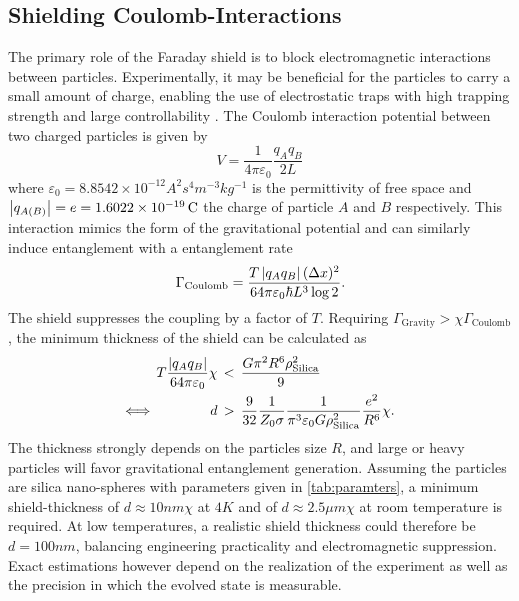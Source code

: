\subsection{Shielding Coulomb-Interactions}
The primary role of the Faraday shield is to block electromagnetic interactions between particles.
Experimentally, it may be beneficial for the particles to carry a small amount of charge, enabling the use of electrostatic traps with high trapping strength and large controllability \cite{GonzalezBallestero_2021}. 
The Coulomb interaction potential between two charged particles is given by
\begin{equation}
  V = \frac{1}{4\pi\varepsilon_0} \frac{q_A q_B}{2L}
\end{equation}
where $\varepsilon_0 = 8.8542\times 10^{-12}\si{A^2 s^4 m^{-3} kg^{-1}}$ is the permittivity of free space and $\left\lvert q_{A(B)}\right\rvert = e = 1.6022\times 10^{-19}\, \mathrm{C}$ the charge of particle $A$ and $B$ respectively.
This interaction mimics the form of the gravitational potential and can similarly induce entanglement with a entanglement rate
\begin{equation}\label{eq:5:entanglement-rate-coulomb}
  \Gamma_\mathrm{Coulomb} = \frac{T \left\lvert q_A q_B\right\rvert (\Delta x)^2}{64 \pi \varepsilon_0 \hbar L^3 \log 2} .
\end{equation}
The shield suppresses the coupling by a factor of $T$.
Requiring $\Gamma_\mathrm{Gravity} > \chi \Gamma_\mathrm{Coulomb}$, the minimum thickness of the shield can be calculated as
\begin{align}\label{eq:5:coulomb-gravity-condition}
  T \frac{\left\lvert q_A q_B\right\rvert}{64 \pi \varepsilon_0} \chi \, &< \, \frac{G \pi^2 R^6 \rho_\mathrm{Silica}^2}{9} \\
  \Longleftrightarrow \quad\quad\quad\quad d \, &> \, \frac{9}{32}\frac{1}{Z_0 \sigma} \frac{1}{\pi^3 \varepsilon_0 G \rho_\mathrm{Silica}^2} \frac{e^2}{R^6} \chi .
\end{align}
The thickness strongly depends on the particles size $R$, and large or heavy particles will favor gravitational entanglement generation.
Assuming the particles are silica nano-spheres with parameters given in \cref{tab:paramters}, a minimum shield-thickness of $d \approx 10\si{nm}\chi$ at $4\si{K}$ and of $d \approx 2.5\si{\mu m}\chi$ at room temperature is required.
At low temperatures, a realistic shield thickness could therefore be $d=100\si{nm}$, balancing engineering practicality and electromagnetic suppression.
Exact estimations however depend on the realization of the experiment as well as the precision in which the evolved state is measurable.

